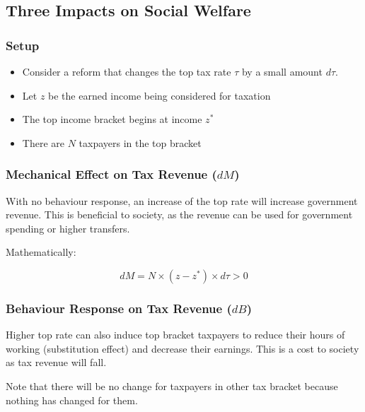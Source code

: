     \subsection{Three Impacts on Social Welfare}\label{sec:optimal_top_tax_impacts}

        \subsubsection{Setup}

        \begin{itemize}
            \item Consider a reform that changes the top tax rate $\tau$ by a small amount $d\tau$.
            \item Let $z$ be the earned income being considered for taxation
            \item The top income bracket begins at income $z^*$
            \item There are $N$ taxpayers in the top bracket
        \end{itemize}
        
        \subsubsection{Mechanical Effect on Tax Revenue ($dM$)}

            With no behaviour response, an increase of the top rate will increase government revenue. This is beneficial to society, as the revenue can be used for government spending or higher transfers.

            Mathematically:

            \begin{equation}
                dM = N \times (z-z^*) \times d\tau > 0
                \label{eqn:tax_top_TR}
            \end{equation}

        \subsubsection{Behaviour Response on Tax Revenue ($dB$)}

            Higher top rate can also induce top bracket taxpayers to reduce their hours of working (substitution effect) and decrease their earnings. This is a cost to society as tax revenue will fall.

            Note that there will be no change for taxpayers in other tax bracket because nothing has changed for them.

